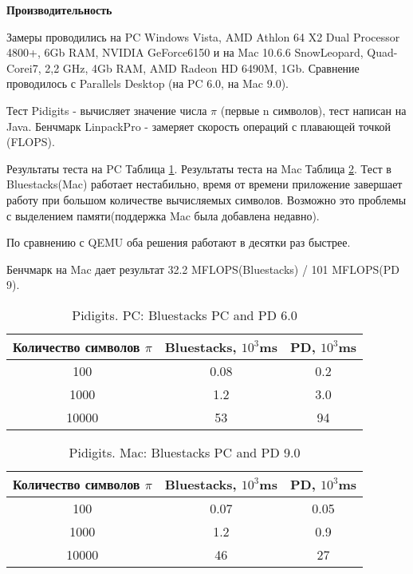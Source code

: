 \textbf{Производительность}

Замеры проводились на PC Windows Vista, AMD Athlon 64 X2 Dual Processor 4800+, 6Gb RAM, NVIDIA GeForce6150 и на Mac 10.6.6 SnowLeopard, Quad-Corei7, 2,2 GHz, 4Gb RAM, AMD Radeon HD 6490M, 1Gb. Сравнение проводилось с Parallels Desktop (на PC 6.0, на Mac 9.0).

Тест Pidigits - вычисляет значение числа ${\pi}$ (первые n символов), тест написан на Java.
Бенчмарк LinpackPro - замеряет скорость операций с плавающей точкой (FLOPS).

Результаты теста на PC Таблица \ref{tab:pc_pidigits}.
Результаты теста на Mac Таблица \ref{tab:mac_pidigits}. Тест в Bluestacks(Mac) работает нестабильно, время от времени приложение завершает работу при большом количестве вычисляемых символов. Возможно это проблемы с выделением памяти(поддержка Mac была добавлена недавно).

По сравнению с QEMU оба решения работают в десятки раз быстрее.

Бенчмарк на Mac дает результат 32.2 MFLOPS(Bluestacks) / 101 MFLOPS(PD 9).

\begin{table}[h]
\caption{\label{tab:pc_pidigits} Pidigits. PC: Bluestacks PC and PD 6.0}
\begin{center}
\begin{tabular} {|c|c|c|}
\hline
Количество символов $\pi$ & Bluestacks, $10^3$ms & PD, $10^3$ms \\
\hline
100 & 0.08 & 0.2 \\
\hline
1000 & 1.2 & 3.0 \\
\hline
10000 & 53 & 94 \\
\hline
\end{tabular}
\end{center}
\end{table}


\begin{table}[h]
\caption{\label{tab:mac_pidigits} Pidigits. Mac: Bluestacks PC and PD 9.0}
\begin{center}
\begin{tabular} {|c|c|c|}
\hline
Количество символов $\pi$ & Bluestacks, $10^3$ms & PD, $10^3$ms \\
\hline
100 & 0.07 & 0.05 \\
\hline
1000 & 1.2 & 0.9 \\
\hline
10000 & 46 & 27 \\
\hline
\end{tabular}
\end{center}
\end{table}

